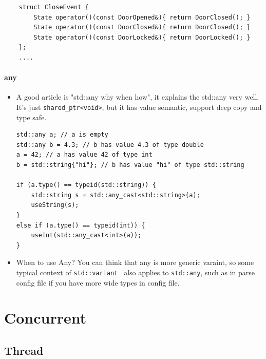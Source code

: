 \documentclass[a4paper,11pt,twoside]{book}
\begin{document}
\begin{itemize}
\begin{lstlisting}
	struct CloseEvent {
		State operator()(const DoorOpened&){ return DoorClosed(); }
		State operator()(const DoorClosed&){ return DoorClosed(); }
		State operator()(const DoorLocked&){ return DoorLocked(); }
	};
	....	
\end{lstlisting}	
		
	\end{itemize}

\subsubsection{any}
\begin{itemize}
	\item A good article is "std::any why when how", it explains the std::any very well. It's just \newline 
	\texttt{shared\_ptr<void>}, but it has value semantic, support deep copy and type safe. 
\begin{lstlisting}
std::any a; // a is empty
std::any b = 4.3; // b has value 4.3 of type double
a = 42; // a has value 42 of type int
b = std::string{"hi"}; // b has value "hi" of type std::string

if (a.type() == typeid(std::string)) {
	std::string s = std::any_cast<std::string>(a);
	useString(s);
}
else if (a.type() == typeid(int)) {
	useInt(std::any_cast<int>(a));
}		
\end{lstlisting}
	
	\item When to use Any?  You can think that any is more generic varaint, so some typical context of \texttt{std::variant } also applies to \texttt{std::any}, such as in parse config file if you have more wide types in config file. 
	
\end{itemize}


\chapter{Concurrent}
\section{Thread}
\end{document}
